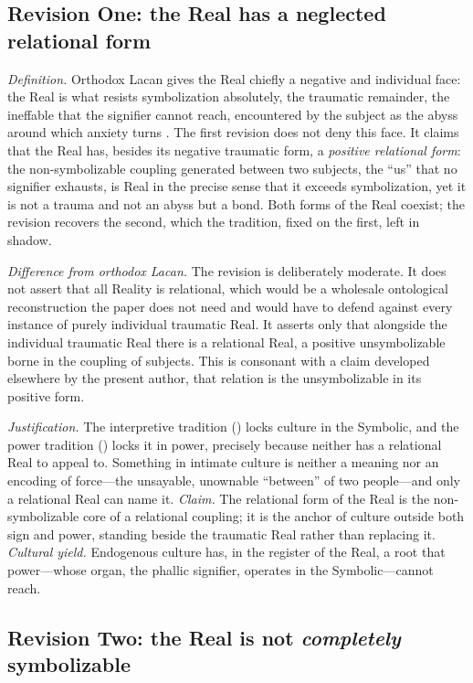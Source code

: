 \subsection*{Revision One: the Real has a neglected relational form}

\emph{Definition.} Orthodox Lacan gives the Real chiefly a negative and individual face: the Real is what resists symbolization absolutely, the traumatic remainder, the ineffable that the signifier cannot reach, encountered by the subject as the abyss around which anxiety turns \parencite{lacan1992vii}. The first revision does not deny this face. It claims that the Real has, besides its negative traumatic form, a \emph{positive relational form}: the non-symbolizable coupling generated between two subjects, the ``us'' that no signifier exhausts, is Real in the precise sense that it exceeds symbolization, yet it is not a trauma and not an abyss but a bond. Both forms of the Real coexist; the revision recovers the second, which the tradition, fixed on the first, left in shadow.

\emph{Difference from orthodox Lacan.} The revision is deliberately moderate. It does not assert that all Reality is relational, which would be a wholesale ontological reconstruction the paper does not need and would have to defend against every instance of purely individual traumatic Real. It asserts only that alongside the individual traumatic Real there is a relational Real, a positive unsymbolizable borne in the coupling of subjects. This is consonant with a claim developed elsewhere by the present author, that relation is the unsymbolizable in its positive form.

\emph{Justification.} The interpretive tradition () locks culture in the Symbolic, and the power tradition () locks it in power, precisely because neither has a relational Real to appeal to. Something in intimate culture is neither a meaning nor an encoding of force---the unsayable, unownable ``between'' of two people---and only a relational Real can name it. \emph{Claim.} The relational form of the Real is the non-symbolizable core of a relational coupling; it is the anchor of culture outside both sign and power, standing beside the traumatic Real rather than replacing it. \emph{Cultural yield.} Endogenous culture has, in the register of the Real, a root that power---whose organ, the phallic signifier, operates in the Symbolic---cannot reach.

\subsection*{Revision Two: the Real is not \emph{completely} symbolizable}


